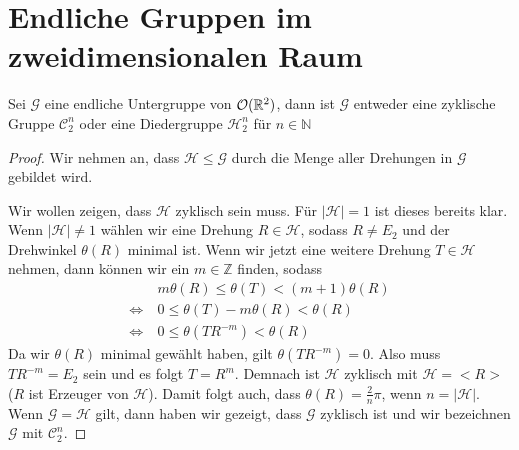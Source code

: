 \section{Endliche Gruppen im zweidimensionalen Raum}
\begin{theorem}
 Sei $\mathcal{G}$ eine endliche Untergruppe von ${\mathcal{O}(\mathbb{R}^2)}$, dann ist $\mathcal{G}$ entweder eine zyklische Gruppe $\mathcal{C}^n_2$ oder eine Diedergruppe $\mathcal{H}^n_2$ für $n \in \mathbb{N}$
\end{theorem}
\begin{proof}
 Wir nehmen an, dass $\mathcal{H} \leq \mathcal{G}$ durch die Menge aller Drehungen in $\mathcal{G}$ gebildet wird.
 
 Wir wollen zeigen, dass $\mathcal{H}$ zyklisch sein muss. Für $|\mathcal{H}|=1$ ist dieses bereits klar. Wenn $|\mathcal{H}| \neq 1$ wählen wir eine Drehung $R \in \mathcal{H}$, sodass $R \neq E_2$ und der Drehwinkel $\theta(R)$ minimal ist. Wenn wir jetzt eine weitere Drehung $T \in \mathcal{H}$ nehmen, dann können wir ein $m \in \mathbb{Z}$ finden, sodass \begin{align*}
        &m \theta(R)\leq\theta(T)<(m+1)\theta(R) \\
        \Leftrightarrow \ &0 \leq \theta(T)-m\theta(R)<\theta(R) \\
        \Leftrightarrow \ &0 \leq \theta(TR^{-m})<\theta(R)                                                                                                                                                                                                                                                                                                                                                           
\end{align*}
Da wir $\theta(R)$ minimal gewählt haben, gilt $\theta(TR^{-m})=0$. Also muss $TR^{-m}=E_2$ sein und es folgt $T=R^{m}$. Demnach ist $\mathcal{H}$ zyklisch mit $\mathcal{H}=<R>$ ($R$ ist Erzeuger von $\mathcal{H}$). Damit folgt auch, dass $\theta(R)=\frac{2}{n}\pi$, wenn $n=|\mathcal{H}|$. Wenn $\mathcal{G} = \mathcal{H}$ gilt, dann haben wir gezeigt, dass $\mathcal{G}$ zyklisch ist und wir bezeichnen $\mathcal{G}$ mit $\mathcal{C}^n_2$.


\end{proof}
